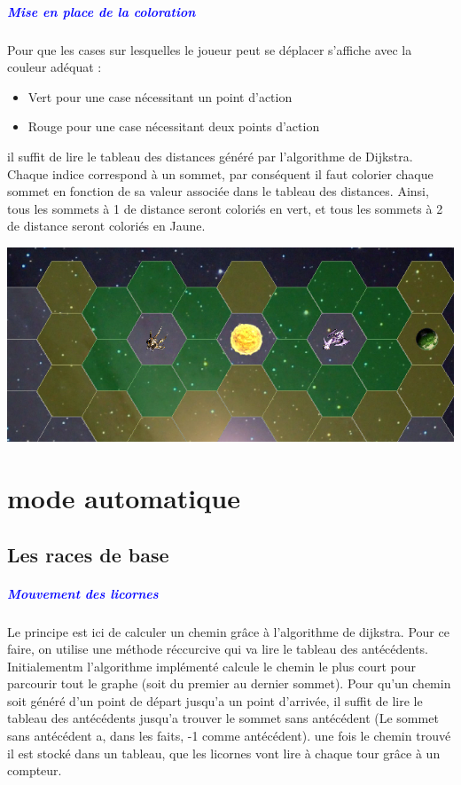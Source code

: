 \documentclass{report}
\begin{document}
			\paragraph{\textcolor{blue}{Mise en place de la coloration}}
			Pour que les cases sur lesquelles le joueur peut se déplacer s'affiche avec la couleur adéquat : 
			\begin{itemize}
				\item Vert pour une case nécessitant un point d'action
				\item Rouge pour une case nécessitant deux points d'action
			\end{itemize}
			il suffit de lire le tableau des distances généré par l'algorithme de Dijkstra. Chaque indice correspond à un sommet, par conséquent il faut colorier chaque sommet en fonction de sa valeur associée dans le tableau des distances. Ainsi, tous les sommets à 1 de distance seront coloriés en vert, et tous les sommets à 2 de distance seront coloriés en Jaune.
			\begin{center} 
      
          \includegraphics[scale=0.30]{Images/colarationMouvement.png} 
     
      \end{center}
			
			
			
	\chapter{mode automatique}
		\section{Les races de base}
			\paragraph{\textcolor{blue}{Mouvement des licornes}}
			Le principe est ici de calculer un chemin gr\^ace \`a l'algorithme de dijkstra. Pour ce faire, on utilise une m\'ethode r\'eccurcive qui va lire le tableau des ant\'ec\'edents. Initialementm l'algorithme impl\'ement\'e calcule le chemin le plus court pour parcourir tout le graphe (soit du premier au dernier sommet). Pour qu'un chemin soit g\'en\'er\'e d'un point de d\'epart jusqu'a un point d'arriv\'ee, il suffit de lire le tableau des ant\'ec\'edents jusqu'a trouver le sommet sans ant\'ec\'edent (Le sommet sans ant\'ec\'edent a, dans les faits, -1 comme ant\'ec\'edent). une fois le chemin trouv\'e il est stock\'e dans un tableau, que les licornes vont lire \`a chaque tour gr\^ace \`a un compteur.
\end{document}
